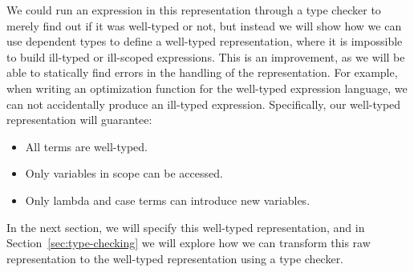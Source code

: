We could run an expression in this representation through a type checker to merely find out if it was well-typed or not, but instead we will show how we can use dependent types to define a well-typed representation, where it is impossible to build ill-typed or ill-scoped expressions. This is an improvement, as we will be able to statically find errors in the handling of the representation. For example, when writing an optimization function for the well-typed expression language, we can not accidentally produce an ill-typed expression. Specifically, our well-typed representation will guarantee:

\begin{itemize}
\item All terms are well-typed.
\item Only variables in scope can be accessed.
\item Only lambda and case terms can introduce new variables.
\end{itemize}

In the next section, we will specify this well-typed representation, and in Section~\ref{sec:type-checking} we will explore how we can transform this raw representation to the well-typed representation using a type checker.

